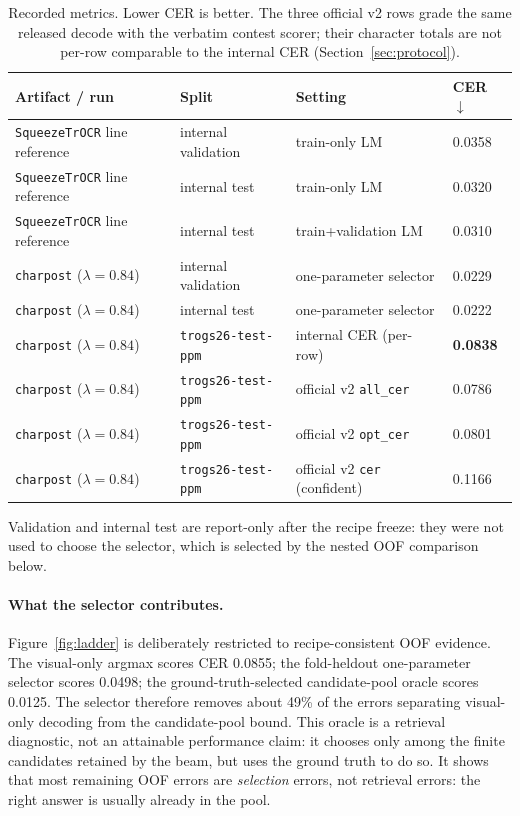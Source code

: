 \documentclass[11pt]{article}
\newcommand{\cer}{\mbox{CER}}
\newcommand{\model}{\texttt{SqueezeTrOCR}}
\newcommand{\charpost}{\texttt{charpost}}
\begin{document}
\begin{table}[htbp]
\centering
\small
\caption{Recorded metrics. Lower \cer{} is better. The three official v2 rows grade the same
released decode with the verbatim contest scorer; their character totals are not per-row
comparable to the internal \cer{} (Section~\ref{sec:protocol}).}
\label{tab:results}
\begin{tabular}{@{}llll@{}}
\toprule
\textbf{Artifact / run} & \textbf{Split} & \textbf{Setting} & \textbf{\cer{} $\downarrow$} \\
\midrule
\model{} line reference & internal validation & train-only LM & 0.0358 \\
\model{} line reference & internal test & train-only LM & 0.0320 \\
\model{} line reference & internal test & train+validation LM & 0.0310 \\
\charpost{} ($\lambda=0.84$) & internal validation & one-parameter selector & 0.0229 \\
\charpost{} ($\lambda=0.84$) & internal test & one-parameter selector & 0.0222 \\
\charpost{} ($\lambda=0.84$) & \texttt{trogs26-test-ppm} & internal CER (per-row) & \textbf{0.0838} \\
\charpost{} ($\lambda=0.84$) & \texttt{trogs26-test-ppm} & official v2 \texttt{all\_cer} & 0.0786 \\
\charpost{} ($\lambda=0.84$) & \texttt{trogs26-test-ppm} & official v2 \texttt{opt\_cer} & 0.0801 \\
\charpost{} ($\lambda=0.84$) & \texttt{trogs26-test-ppm} & official v2 \texttt{cer} (confident) & 0.1166 \\
\bottomrule
\end{tabular}
\end{table}

Validation and internal test are report-only after the recipe freeze: they were not used to
choose the selector, which is selected by the nested OOF comparison below.

\paragraph{What the selector contributes.} Figure~\ref{fig:ladder} is deliberately restricted to
recipe-consistent OOF evidence. The visual-only argmax scores \cer{} 0.0855; the fold-heldout
one-parameter selector scores 0.0498; the ground-truth-selected candidate-pool oracle scores
0.0125. The selector therefore removes about 49\% of the errors separating visual-only decoding from
the candidate-pool bound. This oracle is a retrieval diagnostic, not an attainable performance
claim: it chooses only among the finite candidates retained by the beam, but uses the ground truth
to do so. It shows that most remaining OOF errors are \emph{selection} errors, not retrieval
errors: the right answer is usually already in the pool.
\end{document}
